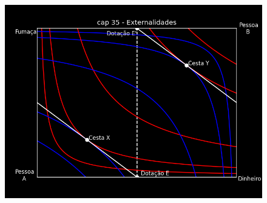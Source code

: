 \documentclass[a4paper,11pt,oneside]{book}
\theoremstyle{definition}
\theoremstyle{break}
\begin{document}
\begin{figure}[H]
	\centering
	\includegraphics[scale=0.8]{cap35_1-dinheiro_fumaca.png}
\end{figure}
\end{document}
